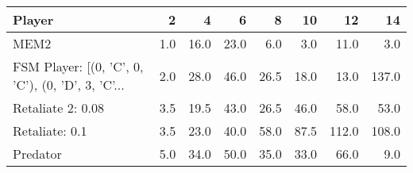 \begin{tabular}{lrrrrrrr}
\toprule
                                            Player &    2 &     4 &     6 &     8 &    10 &     12 &     14 \\
\midrule
                                              MEM2 &  1.0 &  16.0 &  23.0 &   6.0 &   3.0 &   11.0 &    3.0 \\
 FSM Player: [(0, 'C', 0, 'C'), (0, 'D', 3, 'C'... &  2.0 &  28.0 &  46.0 &  26.5 &  18.0 &   13.0 &  137.0 \\
                                 Retaliate 2: 0.08 &  3.5 &  19.5 &  43.0 &  26.5 &  46.0 &   58.0 &   53.0 \\
                                    Retaliate: 0.1 &  3.5 &  23.0 &  40.0 &  58.0 &  87.5 &  112.0 &  108.0 \\
                                          Predator &  5.0 &  34.0 &  50.0 &  35.0 &  33.0 &   66.0 &    9.0 \\
\bottomrule
\end{tabular}
